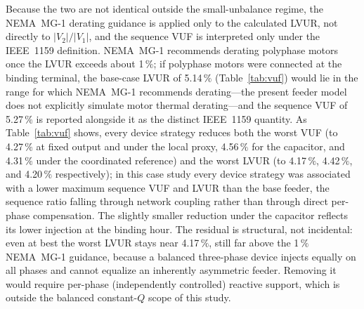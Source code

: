 \documentclass{ieeeaccess}
\providecommand{\percent}{\%}
\newcommand{\SI}[2]{#1\,\ensuremath{\mathrm{#2}}}
\begin{document}
Because the two are not identical outside the small-unbalance regime, the
NEMA~MG-1 derating guidance is applied only to the calculated LVUR, not directly to
$|V_2|/|V_1|$, and the sequence VUF is interpreted only under the IEEE~1159
definition. NEMA~MG-1 recommends derating polyphase motors once the LVUR exceeds
about \SI{1}{\percent}; if polyphase motors were connected at the binding terminal,
the base-case LVUR of \SI{5.14}{\percent} (Table~\ref{tab:vuf}) would lie in the
range for which NEMA~MG-1 recommends derating---the present feeder model does not
explicitly simulate motor thermal derating---and the sequence VUF of
\SI{5.27}{\percent} is reported alongside it as the distinct IEEE~1159 quantity. As
Table~\ref{tab:vuf} shows, every device strategy reduces both the worst VUF (to
\SI{4.27}{\percent} at fixed output and under the local proxy, \SI{4.56}{\percent}
for the capacitor, and \SI{4.31}{\percent} under the coordinated reference) and the
worst LVUR (to \SI{4.17}{\percent}, \SI{4.42}{\percent}, and \SI{4.20}{\percent}
respectively); in this case study every device strategy was associated with a lower
maximum sequence VUF and LVUR than the base feeder, the sequence ratio falling
through network coupling rather than through direct per-phase compensation. The
slightly smaller reduction under the capacitor reflects its lower injection at the
binding hour. The residual is structural, not incidental: even at best the worst
LVUR stays near \SI{4.17}{\percent}, still far above the \SI{1}{\percent} NEMA~MG-1
guidance, because a balanced three-phase device injects equally on all phases and
cannot equalize an inherently asymmetric feeder. Removing it would require per-phase
(independently controlled) reactive support, which is outside the balanced
constant-$Q$ scope of this study.
\end{document}
